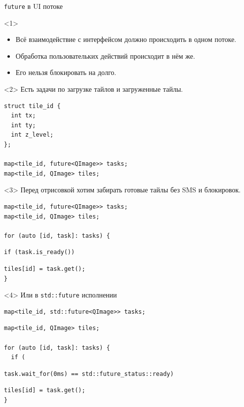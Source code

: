 \documentclass[aspectratio=169,hyperref={unicode},17pt]{beamer}
\begin{document}
\begin{frame}[fragile,t]{\texttt{future} в UI потоке}
\begin{onlyenv}<1>
\begin{itemize}
 \item Всё взаимодействие с интерфейсом должно происходить в одном потоке.
 \item Обработка пользовательких действий происходит в нём же.
 \item Его нельзя блокировать на долго.
\end{itemize}
\end{onlyenv}
\begin{onlyenv}<2>
Есть задачи по загрузке тайлов и загруженные тайлы.
\begin{lstlisting}[style=cppcode]
struct tile_id {
  int tx;
  int ty;
  int z_level;
};

map<tile_id, future<QImage>> tasks;
map<tile_id, QImage> tiles;
 \end{lstlisting}
\end{onlyenv}
\begin{onlyenv}<3>
Перед отрисовкой хотим забирать готовые тайлы без SMS и блокировок.
 \begin{lstlisting}[style=cppcode,aboveskip=0pt,belowskip=0pt]
map<tile_id, future<QImage>> tasks;
map<tile_id, QImage> tiles;

for (auto [id, task]: tasks) {
\end{lstlisting}
\begin{lstlisting}[style=cppcode,backgroundcolor=\color{gray!30},aboveskip=0pt,belowskip=0pt]
  if (task.is_ready())
\end{lstlisting}
\begin{lstlisting}[style=cppcode,aboveskip=0pt,belowskip=0pt]
    tiles[id] = task.get();
}
 \end{lstlisting}
\end{onlyenv}
\begin{onlyenv}<4>
Или в \texttt{std::future} исполнении
 \begin{lstlisting}[style=cppcode,backgroundcolor=\color{gray!30},aboveskip=0pt,belowskip=0pt]
map<tile_id, std::future<QImage>> tasks;
\end{lstlisting}
\begin{lstlisting}[style=cppcode,aboveskip=0pt,belowskip=0pt]
map<tile_id, QImage> tiles;

for (auto [id, task]: tasks) {
  if (
\end{lstlisting}
\begin{lstlisting}[style=cppcode,backgroundcolor=\color{gray!30},aboveskip=0pt,belowskip=0pt]
    task.wait_for(0ms) == std::future_status::ready)
\end{lstlisting}
\begin{lstlisting}[style=cppcode,aboveskip=0pt,belowskip=0pt]
    tiles[id] = task.get();
}
 \end{lstlisting}
\end{onlyenv}
\end{frame}
\end{document}
